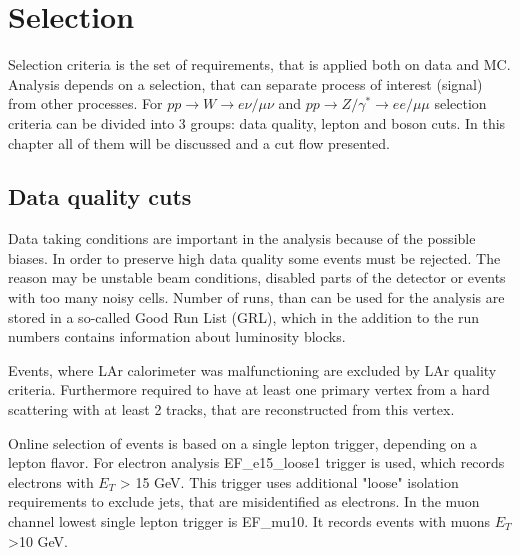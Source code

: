 \chapter{Selection}\label{chap:EventSelection}
Selection criteria is the set of requirements, that is applied both on data and MC. Analysis depends on a selection, that can separate process of interest (signal) from other processes. For $pp \to W \to e\nu/\mu\nu$ and $pp \to Z/\gamma^* \to ee/\mu\mu$ selection criteria can be divided into 3 groups: data quality, lepton and boson cuts. In this chapter all of them will be discussed and a cut flow presented.
\section{Data quality cuts}




Data taking conditions are important in the analysis because of the possible biases. In order to preserve high data quality some events must be rejected. The reason may be unstable beam conditions, disabled parts of the detector or events with too many noisy cells. Number of runs, than can be used for the analysis are stored in a so-called Good Run List (GRL), which in the addition to the run numbers contains information about luminosity blocks. 

Events, where LAr calorimeter was malfunctioning are excluded by LAr quality criteria. Furthermore required to have at least one primary vertex from a hard scattering with at least 2 tracks, that are reconstructed from this vertex. 

Online selection of events is based on a single lepton trigger, depending on a lepton flavor. For electron analysis EF\_e15\_loose1 trigger is used, which records electrons with $E_T$ > 15 GeV. This trigger uses additional "loose" isolation requirements to exclude jets, that are misidentified as electrons. In the muon channel lowest single lepton trigger is EF\_mu10.  It records events with muons $E_T$ >10 GeV.


